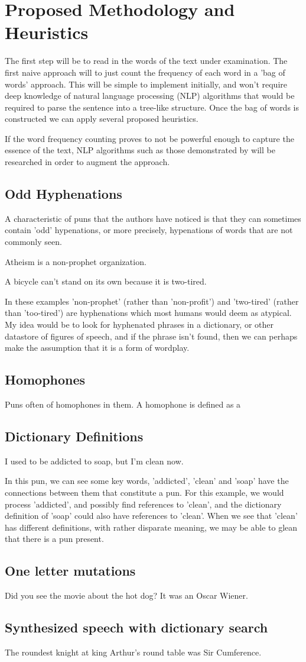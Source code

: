 
\section{Proposed Methodology and Heuristics}
The first step will be to read in the words of the text under examination. The first naive approach will to just count the frequency of each word in a 'bag of words' approach. This will be simple to implement initially, and won't require deep knowledge of natural language processing (NLP) algorithms that would be required to parse the sentence into a tree-like structure. Once the bag of words is constructed we can apply several proposed heuristics.

If the word frequency counting proves to not be powerful enough to capture the essence of the text, NLP algorithms such as those demonstrated by \cite{stanfordparser} will be researched in order to augment the approach. 

\subsection{Odd Hyphenations}
A characteristic of puns that the authors have noticed is that they can sometimes contain 'odd' hypenations, or more precisely, hypenations of words that are not commonly seen.

Atheism is a non-prophet organization.	

A bicycle can't stand on its own because it is two-tired.

In these examples 'non-prophet' (rather than 'non-profit') and 'two-tired' (rather than 'too-tired') are hyphenations which most humans would deem as atypical. My idea would be to look for hyphenated phrases in a dictionary, or other datastore of figures of speech, and if the phrase isn't found, then we can perhaps make the assumption that it is a form of wordplay. 

\subsection{Homophones}
Puns often of homophones in them. A homophone is defined as a 

\subsection{Dictionary Definitions}

I used to be addicted to soap, but I'm clean now.

In this pun, we can see some key words, 'addicted', 'clean' and 'soap' have the connections between them that constitute a pun. For this example, we would process 'addicted', and possibly find references to 'clean', and the dictionary definition of 'soap' could also have references to 'clean'. When we see that 'clean' has different definitions, with rather disparate meaning, we may be able to glean that there is a pun present.

\subsection{One letter mutations}

Did you see the movie about the hot dog? It was an Oscar Wiener.

\subsection{Synthesized speech with dictionary search}
The roundest knight at king Arthur's round table was Sir Cumference.